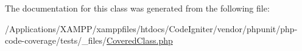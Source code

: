 The documentation for this class was generated from the following file\+:\begin{DoxyCompactItemize}
\item 
/\+Applications/\+X\+A\+M\+P\+P/xamppfiles/htdocs/\+Code\+Igniter/vendor/phpunit/php-\/code-\/coverage/tests/\+\_\+files/\mbox{\hyperlink{php-code-coverage_2tests_2__files_2_covered_class_8php}{Covered\+Class.\+php}}\end{DoxyCompactItemize}
